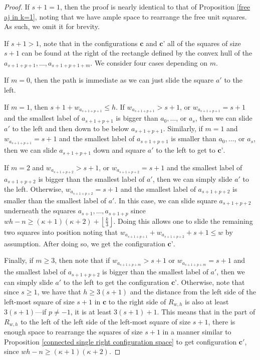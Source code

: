 \documentclass[pagebackref,colorlinks,citecolor=blue,linkcolor=blue,urlcolor=blue,filecolor=blue]{article}
\theoremstyle{definition}\newtheorem{definition}[thm]{Definition}
\theoremstyle{definition}
\begin{document}
\begin{proof}
If $s+1=1$, then the proof is nearly identical to that of Proposition \ref{free aj in k=1}, noting that we have ample space to rearrange the free unit squares.
As such, we omit it for brevity.

If $s+1>1$, note that in the configurations $\textbf{c}$ and $\textbf{c'}$ all of the squares of size $s+1$ can be found at the right of the rectangle defined by the convex hull of the $a_{s+1+p+1},\dots, a_{s+1+p+1+m}$.
We consider four cases depending on $m$.

If $m=0$, then the path is immediate as we can just slide the square $a'$ to the left.

If $m=1$, then $s+1+w_{a_{s+1+p+1}}\le h$.
If $w_{a_{s+1+p+1}}>s+1$, or $w_{a_{s+1+p+1}}=s+1$ and the smallest label of $a_{s+1+p+1}$ is bigger than $a_{0},\dots$, or $a_{s}$, then we can slide $a'$ to the left and then down to be below $a_{s+1+p+1}$. 
Similarly, if $m=1$ and $w_{a_{s+1+p+1}}=s+1$ and the smallest label of $a_{s+1+p+1}$ is smaller than $a_{0},\dots$, or $a_{s}$, then we can slide $a_{s+1+p+1}$ down and square $a'$ to the left to get to $\textbf{c'}$.

If $m=2$ and $w_{a_{s+1+p+2}}>s+1$, or $w_{a_{s+1+p+2}}=s+1$ and the smallest label of $a_{s+1+p+2}$ is bigger than the smallest label of $a'$, then we can simply slide $a'$ to the left.
Otherwise, $w_{a_{s+1+p+2}}=s+1$ and the smallest label of $a_{s+1+p+2}$ is smaller than the smallest label of $a'$.
In this case, we can slide square $a_{s+1+p+2}$ underneath the squares $a_{s+1}, \dots, a_{s+1+p}$ since $wh-n\ge (\kappa+1)(\kappa+2)+\left\lfloor\frac{k}{3}\right\rfloor$.
Doing this allows one to slide the remaining two squares into position noting that $w_{a_{s+1+p+1}}+w_{a_{s+1+p+2}}+s+1\le w$ by assumption.
After doing so, we get the configuration $\textbf{c'}$.

Finally, if $m\ge 3$, then note that if $w_{a_{s+1+p+m}}>s+1$ or $w_{a_{s+1+p+m}}=s+1$ and  the smallest label of $a_{s+1+p+2}$ is bigger than the smallest label of $a'$, then we can simply slide $a'$ to the left to get the configuration $\textbf{c'}$.
Otherwise, note that since $s\ge 1$, we have that $h\ge3(s+1)$ and the distance from the left side of the left-most square of size $s+1$ in $\textbf{c}$ to the right side of $R_{w,h}$ is also at least $3(s+1)$---if $p\neq -1$, it is at least $3(s+1)+1$.
This means that in the part of $R_{w,h}$ to the left of the left side of the left-most square of size $s+1$, there is enough space to rearrange the squares of size $s+1$ in a manner similar to Proposition \ref{connected single right configuration space} to get configuration $\textbf{c}'$, since $wh-n\ge(\kappa+1)(\kappa+2)$.
\end{proof}
\end{document}
